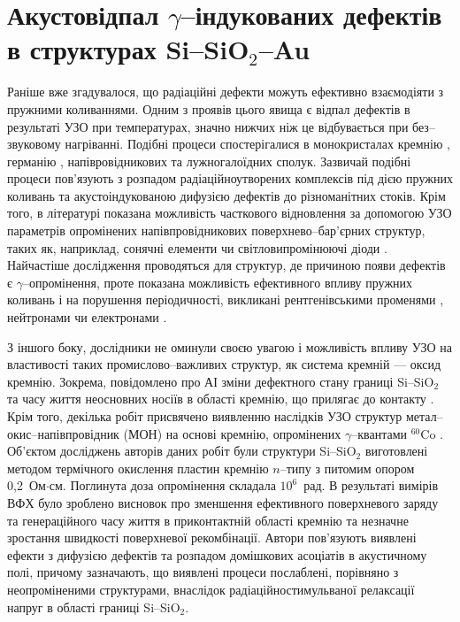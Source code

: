\section{Акустовідпал $\gamma$--індукованих дефектів в структурах Si--SiO$_2$--Au}

Раніше вже згадувалося, що радіаційні дефекти можуть ефективно взаємодіяти з пружними коливаннями.
Одним з проявів цього явища є відпал дефектів в результаті УЗО при температурах, значно нижчих ніж це відбувається при без--звуковому нагріванні.
Подібні процеси спостерігалися в монокристалах кремнію \cite{OstrovRadSi,Podolian2012r,PodolHivr,YOlikh2006TPLr}, германію \cite{Olikh:FTP1996},
напівровідникових \cite{OlikhProc,OstrovFTTRad} та лужногалоїдних \cite{UST:OstrovCsI} сполук.
Зазвичай подібні процеси пов'язують з розпадом радіаційноутворених комплексів під дією пружних коливань та акустоіндукованою дифузією дефектів до різноманітних стоків.
Крім того, в літературі показана можливість часткового відновлення за допомогою УЗО параметрів опромінених напівпровідникових поверхнево--бар'єрних структур, таких як, наприклад,
сонячні елементи \cite{YOlikh2007TPLr} чи світловипромінюючі діоди \cite{US:LED,UST:LED_SM}.
Найчастіше дослідження проводяться для структур, де причиною появи дефектів є $\gamma$--опромінення, проте показана можливість ефективного впливу пружних коливань і на порушення періодичності, викликані
рентгенівськими променями \cite{UST:OstrovCsI}, нейтронами \cite{Olikh:FTP1996} чи електронами \cite{US:LED,UST:LED_SM}.

З іншого боку, дослідники не оминули своєю увагою і можливість впливу УЗО на властивості таких промислово--важливих структур, як система
кремній --- оксид кремнію.
Зокрема, повідомлено про АІ зміни дефектного стану границі  Si--SiO$_2$ \cite{Ostap:SiO2,UST:Medvid,Zaver:2008r} та часу життя неосновних носіїв в області кремнію,
що прилягає до контакту \cite{Parchinskii2003r,Zdeb1989}.
Крім того, декілька робіт присвячено виявленню наслідків УЗО структур метал--окис--напівпровідник (МОН) на основі кремнію, опромінених $\gamma$--квантами $^{60}$Co \cite{Parchinskii2000r,Parchinskii2006r}.
Об'єктом досліджень авторів даних робіт були структури Si--SiO$_2$ виготовлені методом термічного окислення пластин кремнію $n$--типу з питомим опором 0,2~Ом$\cdot$см.
Поглинута доза опромінення складала $10^6$~рад.
В результаті вимірів ВФХ було зроблено висновок про зменшення ефективного поверхневого заряду та генераційного часу життя в приконтактній області кремнію та незначне
зростання швидкості поверхневої рекомбінації.
Автори пов'язують виявлені ефекти з дифузією дефектів та розпадом домішкових асоціатів в акустичному полі, причому зазначають, що виявлені процеси
послаблені, порівняно з неопроміненими структурами, внаслідок радіаційностимульваної релаксації напруг в області границі Si--SiO$_2$.

